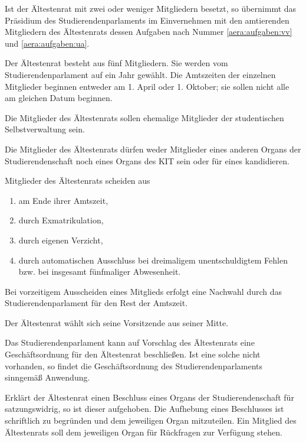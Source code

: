 Ist der Ältestenrat mit zwei oder weniger Mitgliedern besetzt, so übernimmt das Präsidium des Studierendenparlaments im Einvernehmen mit den amtierenden Mitgliedern des Ältestenrats dessen Aufgaben nach  Nummer \ref{aera:aufgaben:vv} und \ref{aera:aufgaben:ua}.



Der Ältestenrat besteht aus fünf Mitgliedern. Sie werden vom Studierendenparlament auf ein Jahr gewählt. Die Amtszeiten der einzelnen Mitglieder beginnen entweder am 1. April oder 1. Oktober; sie sollen nicht alle am gleichen Datum beginnen.

Die Mitglieder des Ältestenrats sollen ehemalige Mitglieder der studentischen Selbstverwaltung sein.

Die Mitglieder des Ältestenrats dürfen weder Mitglieder eines anderen Organs der Studierendenschaft noch eines Organs des KIT sein oder für eines kandidieren.

Mitglieder des Ältestenrats scheiden aus
  \begin{enumerate}
  \item am Ende ihrer Amtszeit,
  \item durch Exmatrikulation,
  \item durch eigenen Verzicht,
  \item durch automatischen Ausschluss bei dreimaligem unentschuldigtem Fehlen bzw. bei insgesamt fünfmaliger Abwesenheit. 
  \end{enumerate}
Bei vorzeitigem Ausscheiden eines Mitglieds erfolgt eine Nachwahl durch das Studierendenparlament für den Rest der Amtszeit.



Der Ältestenrat wählt sich seine Vorsitzende aus seiner Mitte.

Das Studierendenparlament kann auf Vorschlag des Ältestenrats eine Geschäftsordnung für den Ältestenrat beschließen. Ist eine solche nicht vorhanden, so findet die Ge\-schäfts\-ord\-nung des Studierendenparlaments sinngemäß Anwendung.



Erklärt der Ältestenrat einen Beschluss eines Organs der Studierendenschaft für satzungswidrig, so ist dieser aufgehoben. Die Aufhebung eines Beschlusses ist schriftlich zu begründen und dem jeweiligen Organ mitzuteilen. Ein Mitglied des Ältestenrats soll dem jeweiligen Organ für Rückfragen zur Verfügung stehen.

